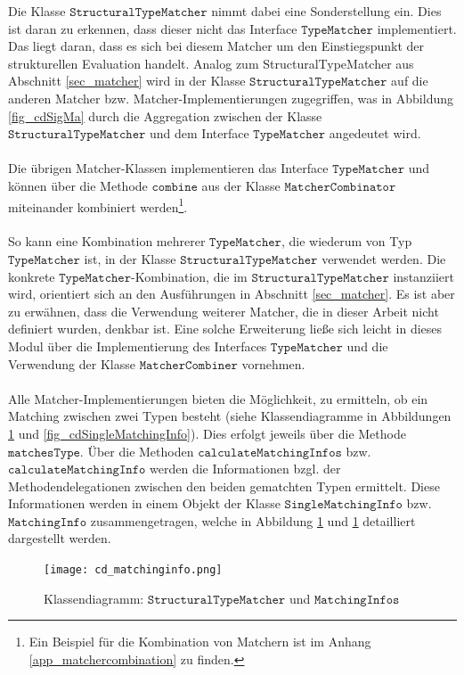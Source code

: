 \noindent
Die Klasse $\texttt{StructuralTypeMatcher}$ nimmt dabei eine Sonderstellung ein. Dies ist daran zu erkennen, dass dieser nicht das Interface $\texttt{TypeMatcher}$ implementiert. Das liegt daran, dass es sich bei diesem Matcher um den Einstiegspunkt der strukturellen Evaluation handelt. Analog zum StructuralTypeMatcher aus Abschnitt \ref{sec_matcher} wird in der Klasse $\texttt{StructuralTypeMatcher}$ auf die anderen Matcher bzw. Matcher-Implementierungen zugegriffen, was in Abbildung \ref{fig_cdSigMa} durch die Aggregation zwischen der Klasse $\texttt{StructuralTypeMatcher}$ und dem Interface $\texttt{TypeMatcher}$ angedeutet wird.
\\\\
Die übrigen Matcher-Klassen implementieren das Interface $\texttt{TypeMatcher}$ und können über die Methode $\texttt{combine}$ aus der Klasse $\texttt{MatcherCombinator}$ miteinander kombiniert werden\footnote{Ein Beispiel für die Kombination von Matchern ist im Anhang \ref{app_matchercombination} zu finden.}. 
\\\\
So kann eine Kombination mehrerer $\texttt{TypeMatcher}$, die wiederum von Typ $\texttt{TypeMatcher}$ ist, in der Klasse $\texttt{StructuralTypeMatcher}$ verwendet werden. Die konkrete $\texttt{TypeMatcher}$-Kombination, die im $\texttt{StructuralTypeMatcher}$ instanziiert wird, orientiert sich an den Ausführungen in Abschnitt \ref{sec_matcher}. Es ist aber zu erwähnen, dass die Verwendung weiterer Matcher, die in dieser Arbeit nicht definiert wurden, denkbar ist. Eine solche Erweiterung ließe sich leicht in dieses Modul über die Implementierung des Interfaces $\texttt{TypeMatcher}$ und die Verwendung der Klasse $\texttt{MatcherCombiner}$ vornehmen.
\\\\
Alle Matcher-Implementierungen bieten die Möglichkeit, zu ermitteln, ob ein Matching zwischen zwei Typen besteht (siehe Klassendiagramme in Abbildungen \ref{fig_cdMatchingInfo} und \ref{fig_cdSingleMatchingInfo}). Dies erfolgt jeweils über die Methode $\texttt{matchesType}$. Über die Methoden $\texttt{calculateMatchingInfos}$ bzw. $\texttt{calculateMatchingInfo}$ werden die Informationen bzgl. der Methodendelegationen zwischen den beiden gematchten Typen ermittelt. Diese Informationen werden in einem Objekt der Klasse $\texttt{SingleMatchingInfo}$ bzw. $\texttt{MatchingInfo}$ zusammengetragen, welche in Abbildung \ref{fig_cdMatchingInfo} und \ref{fig_cdMatchingInfo} detailliert dargestellt werden.
\begin{figure}[h!]
\texttt{[image: cd\_matchinginfo.png]}
\caption{Klassendiagramm: $\texttt{StructuralTypeMatcher}$ und $\texttt{MatchingInfos}$}
\label{fig_cdMatchingInfo}
\end{figure}
